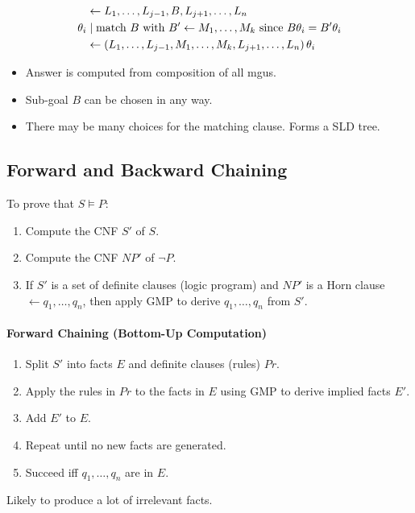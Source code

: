 \documentclass[twocolumn,english]{article}
\begin{document}
\begin{align*}
\: & \leftarrow L_{1},\dots,L_{j-1},B,L_{j+1},\dots,L_{n}\\
\theta_{i} & \mid\text{match \ensuremath{B} with \ensuremath{B'\leftarrow M_{1},\dots,M_{k}} since \ensuremath{B\theta_{i}=B'\theta_{i}}}\\
\: & \leftarrow\left(L_{1},\dots,L_{j-1},M_{1},\dots,M_{k},L_{j+1},\dots,L_{n}\right)\theta_{i}
\end{align*}
\begin{itemize}
\item Answer is computed from composition of all mgus. 
\item Sub-goal $B$ can be chosen in any way. 
\item There may be many choices for the matching clause. Forms a SLD tree. 
\end{itemize}

\subsection{Forward and Backward Chaining}

To prove that $S\vDash P$: 
\begin{enumerate}
\item Compute the CNF $S'$ of $S$. 
\item Compute the CNF $NP'$ of $\lnot P$. 
\item If $S'$ is a set of definite clauses (logic program) and $NP'$ is
a Horn clause $\leftarrow q_{1},\dots,q_{n}$, then apply GMP to derive
$q_{1},\dots,q_{n}$ from $S'$. 
\end{enumerate}

\paragraph{Forward Chaining (Bottom-Up Computation)}
\begin{enumerate}
\item Split $S'$ into facts $E$ and definite clauses (rules) $Pr$. 
\item Apply the rules in $Pr$ to the facts in $E$ using GMP to derive
implied facts $E'$. 
\item Add $E'$ to $E$. 
\item Repeat until no new facts are generated. 
\item Succeed iff $q_{1},\dots,q_{n}$ are in $E$. 
\end{enumerate}
Likely to produce a lot of irrelevant facts.
\end{document}

